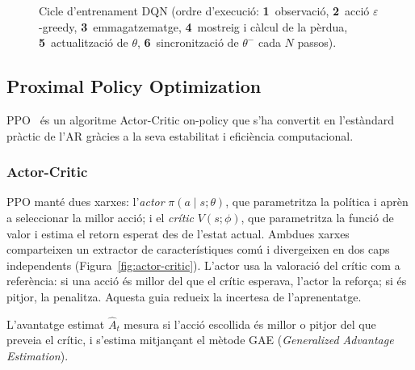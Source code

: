 \begin{figure}[H]
  \caption[Cicle d'entrenament \acs{DQN}.]{Cicle d'entrenament \acs{DQN} (ordre d'execució: \textbf{1}~observació, \textbf{2}~acció $\varepsilon$-greedy, \textbf{3}~emmagatzematge, \textbf{4}~mostreig i càlcul de la pèrdua, \textbf{5}~actualització de $\theta$, \textbf{6}~sincronització de $\theta^-$ cada $N$ passos).}
  \label{fig:dqn}
\end{figure}

\subsection{Proximal Policy Optimization}
\label{sec:ppo}

\ac{PPO}~\cite{schulman2017ppo} és un algoritme Actor-Critic on-policy que
s'ha convertit en l'estàndard pràctic de l'\ac{AR} gràcies a la seva
estabilitat i eficiència computacional.

\subsubsection*{Actor-Critic}

PPO manté dues xarxes: l'\emph{actor} $\pi(a \mid s; \theta)$, que parametritza
la política i aprèn a seleccionar la millor acció; i el \emph{crític}
$V(s; \phi)$, que parametritza la funció de valor i estima el retorn esperat des
de l'estat actual. Ambdues xarxes comparteixen un extractor de característiques
comú i divergeixen en dos caps independents (Figura~\ref{fig:actor-critic}).
L'actor usa la valoració del crític com a referència: si una acció és millor
del que el crític esperava, l'actor la reforça; si és pitjor, la penalitza.
Aquesta guia redueix la incertesa de l'aprenentatge.

L'avantatge estimat $\hat{A}_t$ mesura si l'acció escollida és millor o pitjor
del que preveia el crític, i s'estima mitjançant el mètode GAE
(\emph{Generalized Advantage Estimation}).

